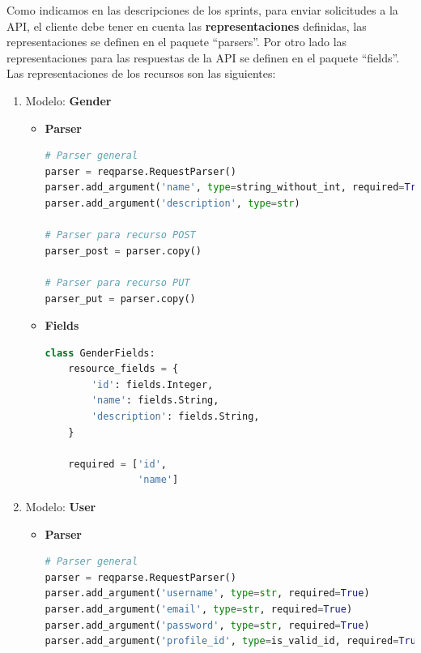 \documentclass[a4paper,12pt]{article}
\begin{document}
Como indicamos en las descripciones de los sprints, para enviar solicitudes a la API, el cliente debe tener en cuenta las \textbf{representaciones} definidas, las representaciones se definen en el paquete ``parsers''. Por otro lado las representaciones para las respuestas de la API se definen en el paquete ``fields''. Las representaciones de los recursos son las siguientes:

\begin{enumerate}

\item Modelo: \textbf{Gender}

\begin{itemize}
	\item \textbf{Parser}
	
\begin{lstlisting}[language=Python]
# Parser general
parser = reqparse.RequestParser()
parser.add_argument('name', type=string_without_int, required=True)
parser.add_argument('description', type=str)

# Parser para recurso POST
parser_post = parser.copy()

# Parser para recurso PUT
parser_put = parser.copy()
\end{lstlisting}
	
	\item \textbf{Fields}
	
\begin{lstlisting}[language=Python]
class GenderFields:
    resource_fields = {
        'id': fields.Integer,
        'name': fields.String,
        'description': fields.String,
    }

    required = ['id',
                'name']
\end{lstlisting}	

\end{itemize}

\item Modelo: \textbf{User}

\begin{itemize}
	\item \textbf{Parser}
	
\begin{lstlisting}[language=Python]
# Parser general
parser = reqparse.RequestParser()
parser.add_argument('username', type=str, required=True)
parser.add_argument('email', type=str, required=True)
parser.add_argument('password', type=str, required=True)
parser.add_argument('profile_id', type=is_valid_id, required=True)


\end{lstlisting}
\end{itemize}
\end{enumerate}
\end{document}
